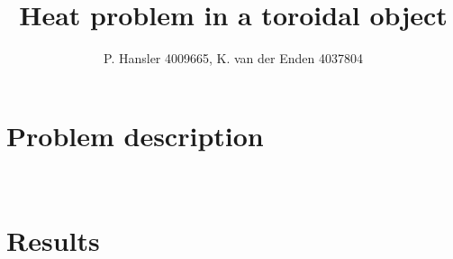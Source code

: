 \documentclass{article}
\begin{document}
\title{Heat problem in a toroidal object}
\author{P. Hansler 4009665, K. van der Enden 4037804}
\maketitle
\newpage
\tableofcontents
\newpage
\section{Problem description}



\\

\newpage
\section{Results}





\newpage
%
\newpage
%
\newpage
%
\newpage

%
\end{document}
